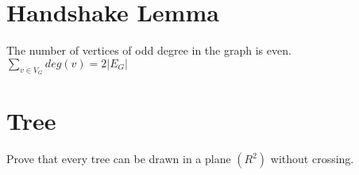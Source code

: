 \documentclass{article}
\begin{document}

\section{Handshake Lemma}
\begin{definition}
The number of vertices of odd degree in the graph is even.\\

$\sum\nolimits_{v \in V_G} deg(v) = 2 | E_G|$
 



\section{Tree}

\end{definition}
\begin{theorem}
  Prove that every tree can be drawn in a plane $(R^2 )$  without crossing.
  \end{theorem}
\end{document}
